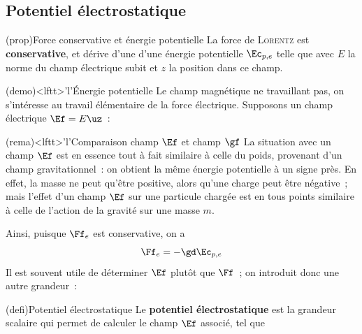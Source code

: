 \documentclass[../../main/main.tex]{subfiles}
\begin{document}
\subsection{Potentiel électrostatique}
\begin{tcb*}(prop){Force conservative et énergie potentielle}
	La force de \textsc{Lorentz} est \textbf{conservative}, et dérive d'une
	d'une énergie potentielle $\Ec_{p,e}$ telle que
	\psw{\[\Ec_{p,e} = -qEz\]}
	avec $E$ la norme du champ électrique subit et $z$ la position dans ce
	champ.
\end{tcb*}
\begin{tcb*}(demo)<lftt>'l'{Énergie potentielle}
	Le champ magnétique ne travaillant pas, on s'intéresse au travail
	élémentaire de la force électrique. Supposons un champ électrique $\Ef =
		E\uz$~:
	\hqed
\end{tcb*}

\begin{tcb*}(rema)<lftt>'l'{Comparaison champ $\protect\Ef$ et champ
	$\protect\gf$}
	La situation avec un champ $\Ef$ est en essence tout à fait similaire à
	celle du poids, provenant d'un champ gravitationnel~: on obtient la même
	énergie potentielle à un signe près. En effet, la masse ne peut qu'être
	positive, alors qu'une charge peut être négative~; mais l'effet d'un champ
	$\Ef$ sur une particule chargée est en tous points similaire à celle de
	l'action de la gravité sur une masse $m$.
\end{tcb*}

Ainsi, puisque $\Ff_e$ est conservative, on a
\[\Ff_e = -\gd\Ec_{p,e}\]
Il est souvent utile de déterminer $\Ef$ plutôt que $\Ff$~; on introduit donc
une autre grandeur~:

\begin{tcb*}(defi){Potentiel électrostatique}
	Le \textbf{potentiel électrostatique} est la grandeur scalaire qui permet de
	calculer le champ $\Ef$ associé, tel que
	\psw{
		\[
			V = \frac{\Ec_{p,e}}{q}
			\Lra
			\boxed{\Ec_{p,e} = qV}
			\quad\Ra\quad
			\Ef = -\gd V
		\]
	}
\end{tcb*}
\end{document}

